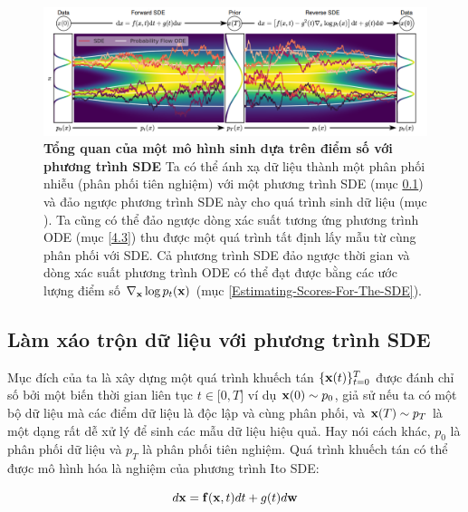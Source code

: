 \documentclass{article} %
\begin{document}
\begin{figure}[h!]
    \centering
    \includegraphics[width=\textwidth]{2.png}
    \caption{\textbf{Tổng quan của một mô hình sinh dựa trên điểm số với phương trình SDE}
    Ta có thể ánh xạ dữ liệu thành một phân phối nhiễu (phân phối tiên nghiệm) với một phương trình SDE (mục \ref{Pertubring-data-with-SDE}) và đảo ngược phương trình SDE này cho quá trình sinh dữ liệu (mục ).
    Ta cũng có thể đảo ngược dòng xác suất tương ứng phương trình ODE (mục \ref{4.3}) thu được một quá trình tất định lấy mẫu từ cùng phân phối với SDE.
    Cả phương trình SDE đảo ngược thời gian và dòng xác suất phương trình ODE có thể đạt được bằng các ước lượng điểm số $\nabla_{\bold{x}} \log p_t (\bold{x})$ (mục \ref{Estimating-Scores-For-The-SDE}).}
    \label{fig:2}
\end{figure}

\subsection{Làm xáo trộn dữ liệu với phương trình SDE} \label{Pertubring-data-with-SDE} \label{2.3}

Mục đích của ta là xây dựng một quá trình khuếch tán $\lbrace \bold{x}(t) \rbrace_{t=0}^T$ được đánh chỉ số bởi một biến thời gian liên tục $t \in \lbrack 0, T \rbrack$ ví dụ $\bold{x}(0) \sim p_0$, giả sử nếu ta có một bộ dữ liệu mà các điểm dữ liệu là độc lập và cùng phân phối, và $\bold{x}(T) \sim p_T$ là một dạng rất dễ xử lý để sinh các mẫu dữ liệu hiệu quả.
Hay nói cách khác, $p_0$ là phân phối dữ liệu và $p_T$ là phân phối tiên nghiệm.
Quá trình khuếch tán có thể được mô hình hóa là nghiệm của phương trình Ito SDE:

\begin{equation} \label{eq:5}
    d \bold{x} = \bold{f} (\bold{x}, t) dt + g(t) d \bold{w}
\end{equation}
\end{document}
